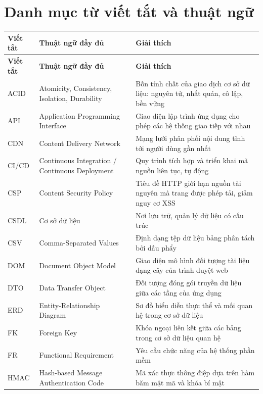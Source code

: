 \chapter*{Danh mục từ viết tắt và thuật ngữ}

\begin{longtable}{|p{2.8cm}|p{5.5cm}|p{6.7cm}|}
\hline
\textbf{Viết tắt} & \textbf{Thuật ngữ đầy đủ} & \textbf{Giải thích} \\
\hline
\endfirsthead
\hline
\textbf{Viết tắt} & \textbf{Thuật ngữ đầy đủ} & \textbf{Giải thích} \\
\hline
\endhead
ACID & Atomicity, Consistency, Isolation, Durability & Bốn tính chất của giao dịch cơ sở dữ liệu: nguyên tử, nhất quán, cô lập, bền vững \\ \hline
API & Application Programming Interface & Giao diện lập trình ứng dụng cho phép các hệ thống giao tiếp với nhau \\ \hline
CDN & Content Delivery Network & Mạng lưới phân phối nội dung tĩnh tới người dùng gần nhất \\ \hline
CI/CD & Continuous Integration / Continuous Deployment & Quy trình tích hợp và triển khai mã nguồn liên tục, tự động \\ \hline
CSP & Content Security Policy & Tiêu đề HTTP giới hạn nguồn tài nguyên mà trang được phép tải, giảm nguy cơ XSS \\ \hline
CSDL & Cơ sở dữ liệu & Nơi lưu trữ, quản lý dữ liệu có cấu trúc \\ \hline
CSV & Comma-Separated Values & Định dạng tệp dữ liệu bảng phân tách bởi dấu phẩy \\ \hline
DOM & Document Object Model & Giao diện mô hình đối tượng tài liệu dạng cây của trình duyệt web \\ \hline
DTO & Data Transfer Object & Đối tượng đóng gói truyền dữ liệu giữa các tầng của ứng dụng \\ \hline
ERD & Entity-Relationship Diagram & Sơ đồ biểu diễn thực thể và mối quan hệ trong cơ sở dữ liệu \\ \hline
FK & Foreign Key & Khóa ngoại liên kết giữa các bảng trong cơ sở dữ liệu quan hệ \\ \hline
FR & Functional Requirement & Yêu cầu chức năng của hệ thống phần mềm \\ \hline
HMAC & Hash-based Message Authentication Code & Mã xác thực thông điệp dựa trên hàm băm mật mã và khóa bí mật \\ \hline

\end{longtable}
